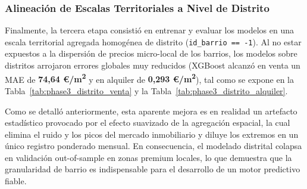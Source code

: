 \documentclass[a4paper,11pt,openany]{book}
\begin{document}
\subsubsection{Alineación de Escalas Territoriales a Nivel de Distrito}
Finalmente, la tercera etapa consistió en entrenar y evaluar los modelos en una escala territorial agregada homogénea de distrito (\texttt{id\_barrio == -1}). Al no estar expuestos a la dispersión de precios micro-local de los barrios, los modelos sobre distritos arrojaron errores globales muy reducidos (XGBoost alcanzó en venta un MAE de \textbf{74,64 €/m\textsuperscript{2}} y en alquiler de \textbf{0,293 €/m\textsuperscript{2}}), tal como se expone en la Tabla~\ref{tab:phase3_distrito_venta} y la Tabla~\ref{tab:phase3_distrito_alquiler}. 

Como se detalló anteriormente, esta aparente mejora es en realidad un artefacto estadístico provocado por el efecto suavizado de la agregación espacial, la cual elimina el ruido y los picos del mercado inmobiliario y diluye los extremos en un único registro ponderado mensual. En consecuencia, el modelado distrital colapsa en validación out-of-sample en zonas premium locales, lo que demuestra que la granularidad de barrio es indispensable para el desarrollo de un motor predictivo fiable.

\begin{table}[H]
\centering
\caption{Matriz de rendimiento comparativa: Alineación de escalas a nivel agregado de distrito con retardos temporales - Mercado de Venta (€/m\textsuperscript{2})}
\label{tab:phase3_distrito_venta}
\end{table}
\end{document}
